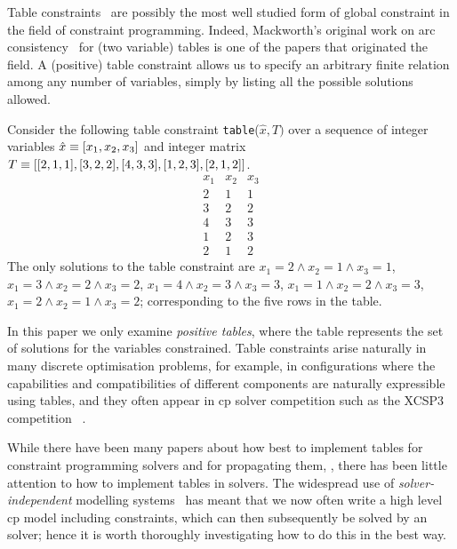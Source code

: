\documentclass[a4paper,UKenglish,cleveref,autoref,thm-restate]{lipics-v2021}
\begin{document}
Table constraints~\cite{GAC,STR2,rolandtable} are possibly the most well studied form of global constraint in the field of constraint programming. 
Indeed, Mackworth's original work on arc consistency~\cite{MACKWORTH197799} for (two variable) tables is 
one of the papers that originated the field.
A (positive) table constraint allows us to specify an arbitrary finite relation among any number of variables, simply by listing all the possible solutions allowed. 

\begin{example}\label{ex:running}
Consider the following table constraint \texttt{table}($\hat{x}, T)$ over a sequence of integer variables $\hat{x} \equiv [x_1, x_2, x_3]$ and integer matrix $T \equiv [
[2,1,1],
[3,2,2],
[4,3,3],
[1,2,3],
[2,1,2]
]$.
\begin{equation*}
\begin{array}{rrr}
x_1 & x_2 & x_3 \\ \hline
2 & 1 & 1 \\
3 & 2 & 2 \\
4 & 3 & 3 \\
1 & 2 & 3 \\
2 & 1 & 2 
\end{array}
\end{equation*}
The only solutions to the table constraint are
$x_1 = 2 \wedge x_2 = 1 \wedge x_3 = 1$,
$x_1 = 3 \wedge x_2 = 2 \wedge x_3 = 2$,
$x_1 = 4 \wedge x_2 = 3 \wedge x_3 = 3$,
$x_1 = 1 \wedge x_2 = 2 \wedge x_3 = 3$,
$x_1 = 2 \wedge x_2 = 1 \wedge x_3 = 2$; corresponding to the five rows in the table.
\end{example}
In this paper we only examine \emph{positive tables}, where the table represents the set of solutions for the variables constrained.
Table constraints arise naturally in many discrete optimisation problems, for example, in configurations where the capabilities and compatibilities of different components are naturally expressible using tables, and they often appear in \gls{cp} solver competition such as the XCSP3 competition ~\cite{audemard2025proceedings2025xcsp3competition}.

While there have been many papers about how best to implement tables for constraint programming solvers and for propagating them, \eg \cite{GAC,STR2}, there has been little attention to how to implement tables in \milp solvers.
The widespread use of \emph{solver-independent} modelling systems~\cite{minizinc,guns2019increasing} has meant that we now often write a high level \gls{cp} model including \ttable constraints, which can then subsequently be solved by an \milp solver; hence it is worth thoroughly investigating how to do this in the best way.
\end{document}
